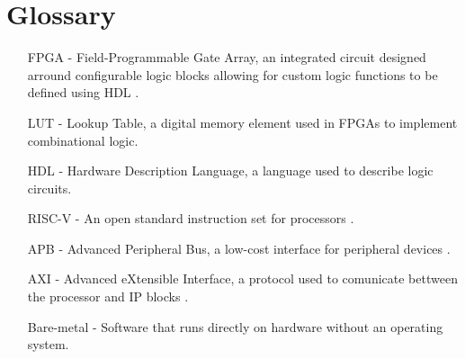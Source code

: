 \documentclass[a4paper,fleqn,twoside,12pt]{article}
\begin{document}


\pagestyle{plain}





\newpage

\section*{Glossary}
\begin{enumerate}
	\item [ FPGA - ] Field-Programmable Gate Array, an integrated circuit designed arround configurable logic blocks allowing for custom logic functions to be defined using HDL \cite{whatisanfpga}.
	\item [ LUT - ] Lookup Table, a digital memory element used in FPGAs to implement combinational logic.
	\item [ HDL - ] Hardware Description Language, a language used to describe logic circuits.
	\item [ RISC-V - ] An open standard instruction set for processors \cite{risc}.
	\item [ APB - ] Advanced Peripheral Bus, a low-cost interface for peripheral devices \cite{APB}.
	\item [ AXI - ]  Advanced eXtensible Interface, a protocol used to comunicate bettween the processor and IP blocks \cite{axi}.
	\item [ Bare-metal - ] Software that runs directly on hardware without an operating system.
\end{enumerate}



\end{document}
